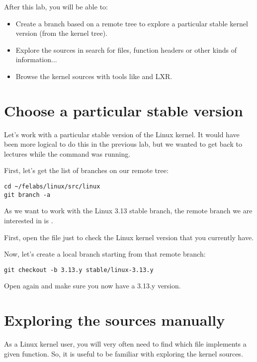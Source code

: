 
After this lab, you will be able to:

\begin{itemize}

\item Create a branch based on a remote tree to explore a particular
      stable kernel version (from the  kernel tree).
\item Explore the sources in search for files, function headers or
  other kinds of information...
\item Browse the kernel sources with tools like  and LXR.
\end{itemize}

\section{Choose a particular stable version}

Let's work with a particular stable version of the Linux kernel.
It would have been more logical to do this in the previous lab, but we
wanted to get back to lectures while the  command was
running.

First, let's get the list of branches on our  remote tree:

\begin{verbatim}
cd ~/felabs/linux/src/linux
git branch -a
\end{verbatim} 

As we want to work with the Linux 3.13 stable branch, the remote branch
we are interested in is .

First, open the  file just to check the Linux kernel
version that you currently have.

Now, let's create a local branch starting from that remote branch:
\begin{verbatim}
git checkout -b 3.13.y stable/linux-3.13.y
\end{verbatim} 

Open  again and make sure you now have a 3.13.y version. 

\section{Exploring the sources manually}

As a Linux kernel user, you will very often need to find which file
implements a given function. So, it is useful to be familiar with
exploring the kernel sources.


